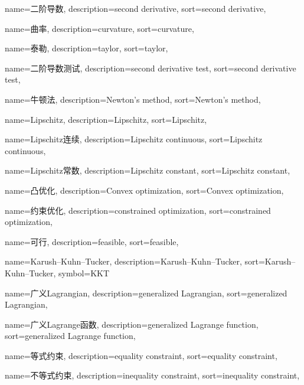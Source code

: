 {
  name=二阶导数,
  description={second derivative},
  sort={second derivative},
}

{
  name=曲率,
  description={curvature},
  sort={curvature},
}

{
  name=泰勒,
  description={taylor},
  sort={taylor},
}

{
  name=二阶导数测试,
  description={second derivative test},
  sort={second derivative test},
}

{
  name=牛顿法,
  description={Newton's method},
  sort={Newton's method},
}

{
  name=Lipschitz,
  description={Lipschitz},
  sort={Lipschitz},
}

{
  name=Lipschitz连续,
  description={Lipschitz continuous},
  sort={Lipschitz continuous},
}

{
  name=Lipschitz常数,
  description={Lipschitz constant},
  sort={Lipschitz constant},
}

{
  name=凸优化,
  description={Convex optimization},
  sort={Convex optimization},
}

{
  name=约束优化,
  description={constrained optimization},
  sort={constrained optimization},
}

{
  name=可行,
  description={feasible},
  sort={feasible},
}

{
  name=Karush–Kuhn–Tucker,
  description={Karush–Kuhn–Tucker},
  sort={Karush–Kuhn–Tucker},
  symbol={KKT}
}

{
  name=广义Lagrangian,
  description={generalized Lagrangian},
  sort={generalized Lagrangian},
}

{
  name=广义Lagrange函数,
  description={generalized Lagrange function},
  sort={generalized Lagrange function},
}

{
  name=等式约束,
  description={equality constraint},
  sort={equality constraint},
}

{
  name=不等式约束,
  description={inequality constraint},
  sort={inequality constraint},
}

